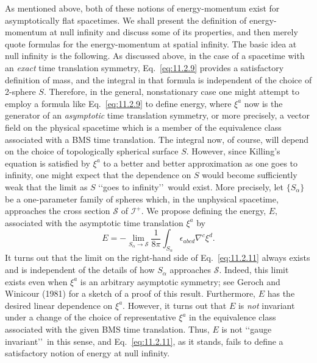 As mentioned above, both of these notions of energy-momentum exist for
asymptotically flat spacetimes. We shall present the definition of energy-momentum
at null infinity and discuss some of its properties, and then merely quote formulas
for the energy-momentum at spatial infinity. The basic idea at null infinity is the
following. As discussed above, in the case of a spacetime with an \emph{exact} time
translation symmetry, Eq.~\eqref{eq:11.2.9} provides a satisfactory definition of
mass, and the integral in that formula is independent of the choice of 2-sphere
\(S\). Therefore, in the general, nonstationary case one might attempt to employ a
formula like Eq.~\eqref{eq:11.2.9} to define energy, where \(\xi^a\) now is the
generator of an \emph{asymptotic} time translation symmetry, or more precisely, a
vector field on the physical spacetime which is a member of the equivalence class
associated with a BMS time translation. The integral now, of course, will depend on
the choice of topologically spherical surface \(S\). However, since Killing's equation
is satisfied by \(\xi^a\) to a better and better approximation as one goes to infinity,
one might expect that the dependence on \(S\) would become sufficiently weak that
the limit as \(S\) \lq\lq goes to infinity\rq\rq\ would exist. More precisely, let
\(\{S_\alpha\}\) be a one-parameter family of spheres which, in the unphysical
spacetime, approaches the cross section \(\mathcal S\) of \(\mathcal I^+\). We
propose defining the energy, \(E\), associated with the asymptotic time translation
\(\xi^a\) by
\begin{equation}
  E=-\lim_{S_\alpha\to\mathcal S}\frac{1}{8\pi}
  \int_{S_\alpha}\epsilon_{abcd}\nabla^c\xi^d.
  \tag{11.2.11}\label{eq:11.2.11}
\end{equation}
It turns out that the limit on the right-hand side of Eq.~\eqref{eq:11.2.11} always
exists and is independent of the details of how \(S_\alpha\) approaches
\(\mathcal S\). Indeed, this limit exists even when \(\xi^a\) is an arbitrary
asymptotic symmetry; see Geroch and Winicour (1981) for a sketch of a proof of this
result. Furthermore, \(E\) has the desired linear dependence on \(\xi^a\). However,
it turns out that \(E\) is \emph{not} invariant under a change of the choice of
representative \(\xi^a\) in the equivalence class associated with the given BMS time
translation. Thus, \(E\) is not \lq\lq gauge invariant\rq\rq\ in this sense, and
Eq.~\eqref{eq:11.2.11}, as it stands, fails to define a satisfactory notion of energy
at null infinity.

